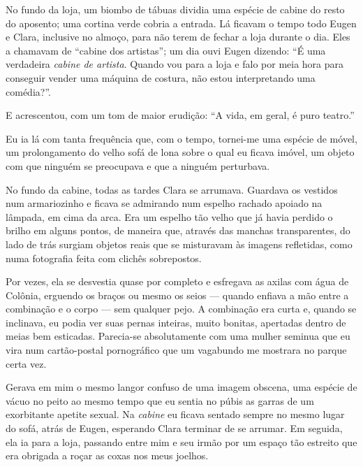 No fundo da loja, um biombo de tábuas dividia uma espécie de cabine do resto do aposento; uma cortina verde cobria a entrada. Lá ficavam o tempo todo Eugen e Clara, inclusive no almoço, para não terem de fechar a loja durante o dia. Eles a chamavam de ``cabine dos artistas''; um dia ouvi Eugen dizendo: ``É uma verdadeira \textit{cabine de artista}. Quando vou para a loja e falo por meia hora para conseguir vender uma máquina de costura, não estou interpretando uma comédia?''.

E acrescentou, com um tom de maior erudição: ``A vida, em geral, é puro teatro.''


Eu ia lá com tanta frequência que, com o tempo, tornei-me uma espécie de móvel, um prolongamento do velho sofá de lona sobre o qual eu ficava imóvel, um objeto com que ninguém se preocupava e que a ninguém perturbava.

No fundo da cabine, todas as tardes Clara se arrumava. Guardava os vestidos num armariozinho e ficava se admirando num espelho rachado apoiado na lâmpada, em cima da arca. Era um espelho tão velho que já havia perdido o brilho em alguns pontos, de maneira que, através das manchas transparentes, do lado de trás surgiam objetos reais que se misturavam às imagens refletidas, como numa fotografia feita com clichês sobrepostos.

Por vezes, ela se desvestia quase por completo e esfregava as axilas com água de Colônia, erguendo os braços ou mesmo os seios --- quando enfiava a mão entre a combinação e o corpo --- sem qualquer pejo. A combinação era curta e, quando se inclinava, eu podia ver suas pernas inteiras, muito bonitas, apertadas dentro de meias bem esticadas. Parecia-se absolutamente com uma mulher seminua que eu vira num cartão-postal pornográfico que um vagabundo me mostrara no parque certa vez.

Gerava em mim o mesmo langor confuso de uma imagem obscena, uma espécie de vácuo no peito ao mesmo tempo que eu sentia no púbis as garras de um exorbitante apetite sexual.
Na \textit{cabine} eu ficava sentado sempre no mesmo lugar do sofá, atrás de Eugen, esperando Clara terminar de se arrumar. Em seguida, ela ia para a loja, passando entre mim e seu irmão por um espaço tão estreito que era obrigada a roçar as coxas nos meus joelhos.

